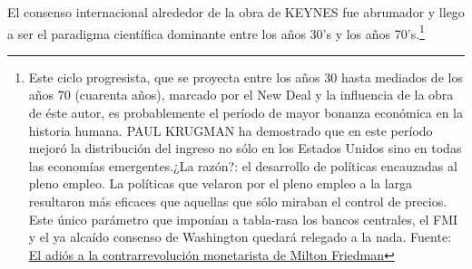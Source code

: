 \documentclass[10pt,a4paper]{article}
\begin{document}
El consenso internacional alrededor de la obra de KEYNES fue abrumador y llego a ser el paradigma científica dominante entre los años 30's y los años 70's.\footnote{%
    Este ciclo progresista, que se proyecta entre los años 30 hasta mediados de los años 70 (cuarenta años), marcado por el New Deal y la influencia de la obra de éste autor, es probablemente el período de mayor bonanza económica en la historia humana. PAUL KRUGMAN ha demostrado que en este período mejoró la distribución del ingreso no sólo en los Estados Unidos sino en todas las economías emergentes.¿La razón?: el desarrollo de políticas encauzadas al pleno empleo.
La políticas que velaron por el pleno empleo a la larga resultaron más eficaces que aquellas que sólo miraban el control de precios. Este único parámetro que imponían a tabla-rasa los bancos centrales, el FMI y el ya alcaído consenso de Washington quedará relegado a la nada. Fuente: \href{https://www.elblogsalmon.com/historia-de-la-economia/el-adios-a-la-contrarrevolucion-monetarista}{El adiós a la contrarrevolución monetarista de Milton Friedman}
}
\end{document}
